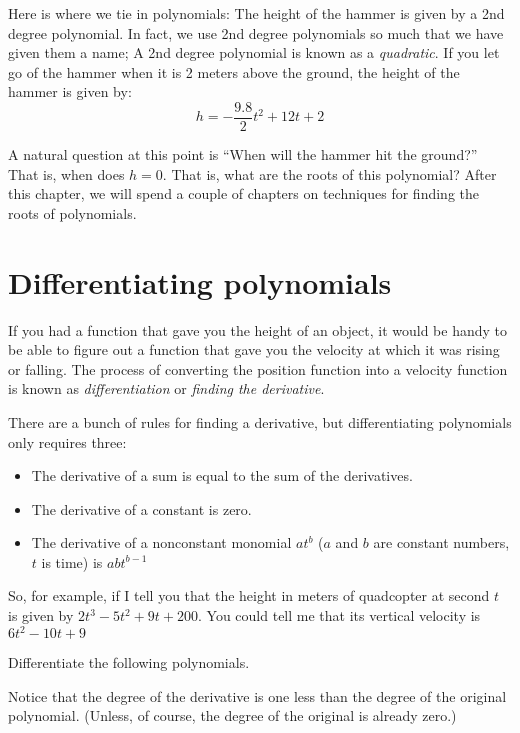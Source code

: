 Here is where we tie in polynomials: The height of the hammer is given
by a 2nd degree polynomial. In fact, we use 2nd degree polynomials so
much that we have given them a name; A 2nd degree polynomial is known
as a \emph{quadratic}. If you let go of the hammer when it is 2 meters
above the ground, the height of the hammer is given by:
\begin{equation*}
  h = -\frac{9.8}{2}t^2 + 12t + 2
\end{equation*}

A natural question at this point is ``When will the hammer hit the
ground?''  That is, when does $h = 0$. That is, what are the roots of
this polynomial? After this chapter, we will spend a couple of
chapters on techniques for finding the roots of polynomials.

\section{Differentiating polynomials}

If you had a function that gave you the height of an object, it would
be handy to be able to figure out a function that gave you the
velocity at which it was rising or falling. The process of converting
the position function into a velocity function is known as
\emph{differentiation} or \emph{finding the derivative}.

There are a bunch of rules for finding a derivative, but
differentiating polynomials only requires three:
\begin{itemize}
\item The derivative of a sum is equal to the sum of the derivatives.
\item The derivative of a constant is zero.
\item The derivative of a nonconstant monomial $at^b$ ($a$ and $b$ are constant numbers, $t$ is time) is $abt^{b-1}$ 
\end{itemize}

So, for example, if I tell you that the height in meters of quadcopter
at second $t$ is given by $2t^3 - 5t^2 + 9t + 200$. You could tell me
that its vertical velocity is $6t^{2} - 10t + 9$

\begin{Exercise}[title={Differentation of polynomials}, label=diffpoly]
  Differentiate the following polynomials.
\end{Exercise}
\begin{Answer}[ref=diffpoly]
\end{Answer}
Notice that the degree of the derivative is one less than the degree
of the original polynomial. (Unless, of course, the degree of the
original is already zero.)

